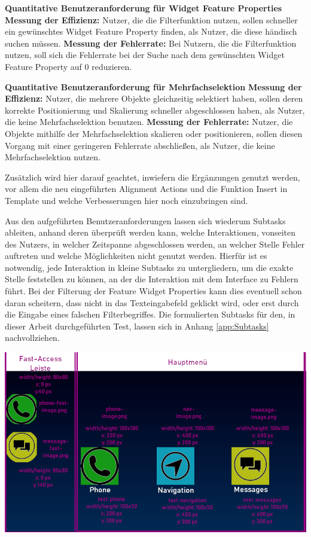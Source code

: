\textbf{Quantitative Benutzeranforderung für Widget Feature Properties} \newline
\textbf{Messung der Effizienz:}
Nutzer, die die Filterfunktion nutzen, sollen schneller ein gewünschtes Widget Feature Property finden, als Nutzer, die diese händisch suchen müssen. \newline
\textbf{Messung der Fehlerrate:}
Bei Nutzern, die die Filterfunktion nutzen, soll sich die Fehlerrate bei der Suche nach dem gewünschten Widget Feature Property auf 0 reduzieren.

\textbf{Quantitative Benutzeranforderung für Mehrfachselektion}\newline
\textbf{Messung der Effizienz:}
Nutzer, die mehrere Objekte gleichzeitig selektiert haben, sollen deren korrekte Positionierung  und Skalierung schneller abgeschlossen haben, als Nutzer, die keine Mehrfachselektion benutzen.\newline
\textbf{Messung der Fehlerrate:}
Nutzer, die Objekte mithilfe der Mehrfachselektion skalieren oder positionieren, sollen diesen Vorgang mit einer geringeren Fehlerrate abschließen, als Nutzer, die keine Mehrfachselektion nutzen.

Zusätzlich wird hier darauf geachtet, inwiefern die Ergänzungen genutzt werden, vor allem die neu eingeführten \glqq Alignment Actions\grqq{} und die Funktion \glqq Insert in Template\grqq{} und welche Verbesserungen hier noch einzubringen sind.

Aus den aufgeführten Benutzeranforderungen lassen sich wiederum Subtasks ableiten, anhand deren überprüft werden kann, welche Interaktionen, vonseiten des Nutzers, in welcher Zeitspanne abgeschlossen werden, an welcher Stelle Fehler auftreten und welche Möglichkeiten nicht genutzt werden.
Hierfür ist es notwendig, jede Interaktion in kleine Subtasks zu untergliedern, um die exakte Stelle feststellen zu können, an der die Interaktion mit dem Interface zu Fehlern führt.
Bei der Filterung der Feature Widget Properties kann dies eventuell schon daran scheitern, dass nicht in das Texteingabefeld geklickt wird, oder erst durch die Eingabe eines falschen Filterbegriffes.
Die formulierten Subtasks für den, in dieser Arbeit durchgeführten Test, lassen sich in Anhang \ref{app:Subtasks} nachvollziehen.

\begin{center}
  \includegraphics[width=0.9\linewidth]{figures/Styleguide_Rahmen.png}
  \label{fig:Styleguide}
\end{center}

